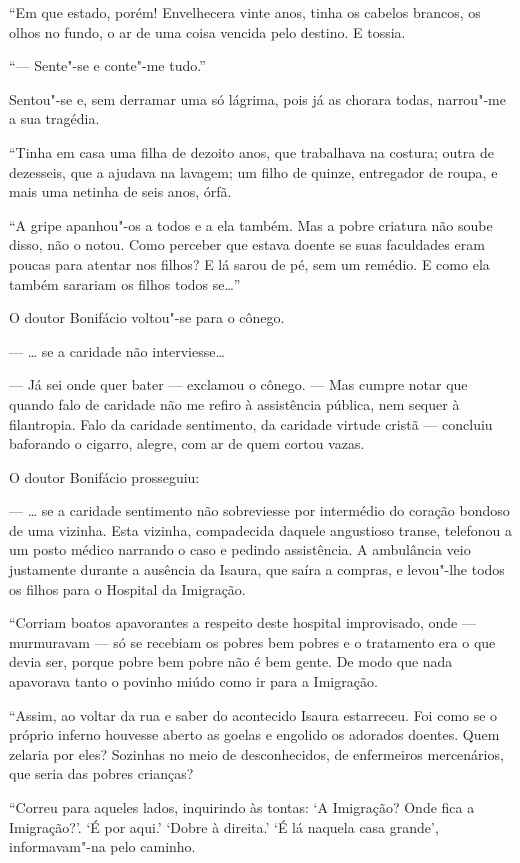 ``Em que estado, porém! Envelhecera vinte anos, tinha os cabelos
brancos, os olhos no fundo, o ar de uma coisa vencida pelo destino. E
tossia.

``--- Sente"-se e conte"-me tudo.''

Sentou"-se e, sem derramar uma só lágrima, pois já as chorara todas,
narrou"-me a sua tragédia.

``Tinha em casa uma filha de dezoito anos, que trabalhava na costura;
outra de dezesseis, que a ajudava na lavagem; um filho de quinze,
entregador de roupa, e mais uma netinha de seis anos, órfã.

``A gripe apanhou"-os a todos e a ela também. Mas a pobre criatura não
soube disso, não o notou. Como perceber que estava doente se suas
faculdades eram poucas para atentar nos filhos? E lá sarou de pé, sem um
remédio. E como ela também sarariam os filhos todos se\ldots{}''

O doutor Bonifácio voltou"-se para o cônego.

--- \ldots{} se a caridade não interviesse\ldots{}

--- Já sei onde quer bater --- exclamou o cônego. --- Mas cumpre notar
que quando falo de caridade não me refiro à assistência pública, nem
sequer à filantropia. Falo da caridade sentimento, da caridade virtude
cristã --- concluiu baforando o cigarro, alegre, com ar de quem cortou
vazas.

O doutor Bonifácio prosseguiu:

--- \ldots{} se a caridade sentimento não sobreviesse por intermédio do
coração bondoso de uma vizinha. Esta vizinha, compadecida daquele
angustioso transe, telefonou a um posto médico narrando o caso e pedindo
assistência. A ambulância veio justamente durante a ausência da Isaura,
que saíra a compras, e levou"-lhe todos os filhos para o Hospital da
Imigração.

``Corriam boatos apavorantes a respeito deste hospital improvisado, onde
--- murmuravam --- só se recebiam os pobres bem pobres e o tratamento
era o que devia ser, porque pobre bem pobre não é bem gente. De modo que
nada apavorava tanto o povinho miúdo como ir para a Imigração.

``Assim, ao voltar da rua e saber do acontecido Isaura estarreceu. Foi
como se o próprio inferno houvesse aberto as goelas e engolido os
adorados doentes. Quem zelaria por eles? Sozinhas no meio de
desconhecidos, de enfermeiros mercenários, que seria das pobres
crianças?

``Correu para aqueles lados, inquirindo às tontas: `A Imigração? Onde
fica a Imigração?'. `É por aqui.' `Dobre à direita.' `É lá naquela casa
grande', informavam"-na pelo caminho.

